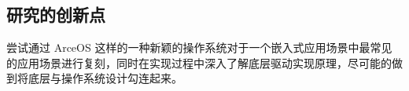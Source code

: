 \subsection{研究的创新点}
    
    尝试通过 ArceOS 这样的一种新颖的操作系统对于一个嵌入式应用场景中最常见的应用场景进行复刻，同时在实现过程中深入了解底层驱动实现原理，尽可能的做到将底层与操作系统设计勾连起来。



